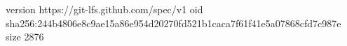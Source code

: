 version https://git-lfs.github.com/spec/v1
oid sha256:244b4806e8c9ae15a86e954d20270fd521b1caca7f61f41e5a07868cfd7c987e
size 2876
